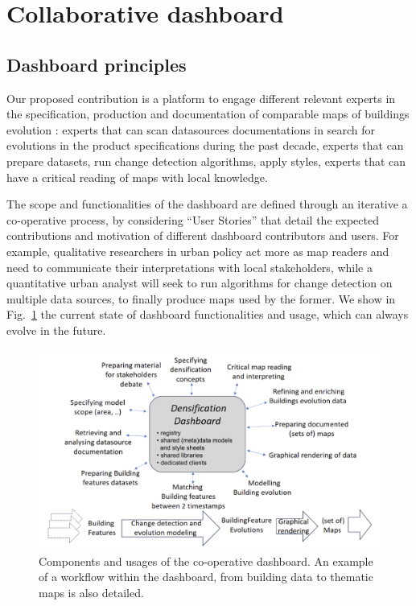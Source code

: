 \documentclass[agile, final]{copernicus-agile}
\begin{document}
\section{Collaborative dashboard}


\subsection{Dashboard principles}


Our proposed contribution is a platform to engage different relevant experts in the specification, production and documentation of comparable maps of buildings evolution : experts that can scan datasources documentations in search for evolutions in the product specifications during the past decade, experts that can prepare datasets, run change detection algorithms, apply styles, experts that can have a critical reading of maps with local knowledge.  

The scope and functionalities of the dashboard are defined through an iterative a co-operative process, by considering ``User Stories'' that detail the expected contributions and motivation of different dashboard contributors and users. For example, qualitative researchers in urban policy act more as map readers and need to communicate their interpretations with local stakeholders, while a quantitative urban analyst will seek to run algorithms for change detection on multiple data sources, to finally produce maps used by the former. We show in Fig.~\ref{fig:dashboard} the current state of dashboard functionalities and usage, which can always evolve in the future.

\begin{figure}[ht]
  \includegraphics[width=0.8\linewidth]{figures/dashboard.png}
\caption{Components and usages of the co-operative dashboard. An example of a workflow within the dashboard, from building data to thematic maps is also detailed.}
\label{fig:dashboard} 
\end{figure}
\end{document}
